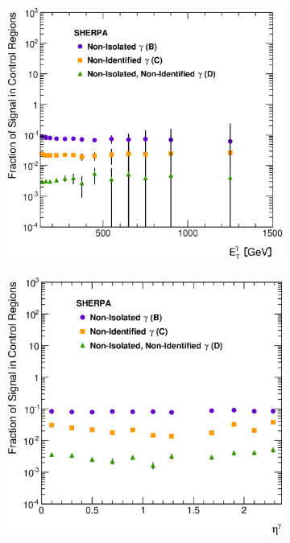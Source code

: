 \documentclass[12pt, twoside]{article}
\numberwithin{equation}{section}
\numberwithin{figure}{section}
\newenvironment{changemargin}[2]{%
\begin{list}{}{%
\setlength{\topsep}{0pt}%
\setlength{\leftmargin}{#1}%
\setlength{\rightmargin}{#2}%
\setlength{\listparindent}{\parindent}%
\setlength{\itemindent}{\parindent}%
\setlength{\parsep}{\parskip}%
}%
\item[]}{\end{list}}
\begin{document}
\begin{figure}
    \centering
    \checkoddpage
    \ifoddpage
        \begin{changemargin}{-1.0cm}{-0.75cm}
    \else
        \begin{changemargin}{-0.75cm}{-1.0cm}
    \fi
        \begin{subfigure}[b]{0.37\textwidth}
            \includegraphics[width=\textwidth]{./images/SignalLeakageFractionsSherpa/SLF-101.eps}
            \subcaption{}
            \label{fig:SLFEtPhoton}
        \end{subfigure}
        \begin{subfigure}[b]{0.37\textwidth}
            \includegraphics[width=\textwidth]{./images/SignalLeakageFractionsSherpa/SLF-102.eps}

\end{subfigure}
\end{changemargin}
\end{changemargin}
\end{figure}
\end{document}
